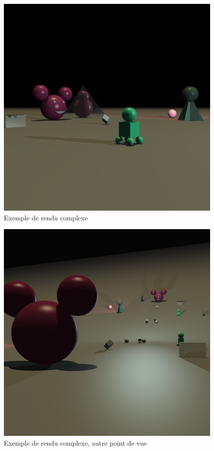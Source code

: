 \documentclass[a4paper]{article}
\begin{document}
      \begin{figure}[p]
        \centerline{
          \includegraphics[width=1.2\textwidth]{0377.png}
        }
        \caption{Exemple de rendu complexe}
      \end{figure}
      \begin{figure}[p]
        \centerline{
          \includegraphics[width=1.2\textwidth]{0699.png}
        }
        \caption{Exemple de rendu complexe, autre point de vue}
      \end{figure}
\end{document}
